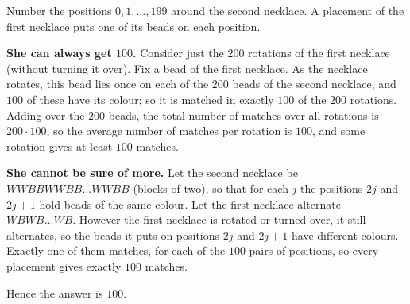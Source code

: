 Number the positions $0,1,\dots,199$ around the second necklace. A placement of the first necklace puts one of its beads on each position.

\textbf{She can always get $100$.} Consider just the $200$ rotations of the first necklace (without turning it over). Fix a bead of the first necklace. As the necklace rotates, this bead lies once on each of the $200$ beads of the second necklace, and $100$ of these have its colour; so it is matched in exactly $100$ of the $200$ rotations. Adding over the $200$ beads, the total number of matches over all rotations is $200\cdot100$, so the average number of matches per rotation is $100$, and some rotation gives at least $100$ matches.

\textbf{She cannot be sure of more.} Let the second necklace be $WWBBWWBB\ldots WWBB$ (blocks of two), so that for each $j$ the positions $2j$ and $2j+1$ hold beads of the same colour. Let the first necklace alternate $WBWB\ldots WB$. However the first necklace is rotated or turned over, it still alternates, so the beads it puts on positions $2j$ and $2j+1$ have different colours. Exactly one of them matches, for each of the $100$ pairs of positions, so every placement gives exactly $100$ matches.

Hence the answer is $\boxed{100}$.
